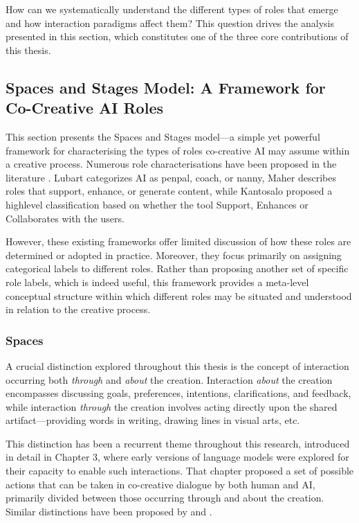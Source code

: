 How can we systematically understand the different types of roles that emerge and how interaction paradigms affect them? This question drives the analysis presented in this section, which constitutes one of the three core contributions of this thesis.

\subsection{Spaces and Stages Model: A Framework for Co-Creative AI Roles}

This section presents the Spaces and Stages model—a simple yet powerful framework for characterising the types of roles co-creative AI may assume within a creative process. Numerous role characterisations have been proposed in the literature \cite{Lubart2005-zi, Kantosalo2019-pz, Maher2012-oj}. Lubart categorizes AI as penpal, coach, or nanny, Maher describes roles that support, enhance, or generate content, while Kantosalo proposed a highlevel classification based on whether the tool Support, Enhances or Collaborates with the users.

However, these existing frameworks offer limited discussion of how these roles are determined or adopted in practice. Moreover, they focus primarily on assigning categorical labels to different roles. Rather than proposing another set of specific role labels, which is indeed useful, this framework provides a meta-level conceptual structure within which different roles may be situated and understood in relation to the creative process.

\subsubsection{Spaces}

A crucial distinction explored throughout this thesis is the concept of interaction occurring both \textit{through} and \textit{about} the creation. Interaction \textit{about} the creation encompasses discussing goals, preferences, intentions, clarifications, and feedback, while interaction \textit{through} the creation involves acting directly upon the shared artifact—providing words in writing, drawing lines in visual arts, etc.

This distinction has been a recurrent theme throughout this research, introduced in detail in Chapter 3, where early versions of language models were explored for their capacity to enable such interactions. That chapter proposed a set of possible actions that can be taken in co-creative dialogue by both human and AI, primarily divided between those occurring through and about the creation. Similar distinctions have been proposed by \cite{rezwana} and \cite{kellas}.

